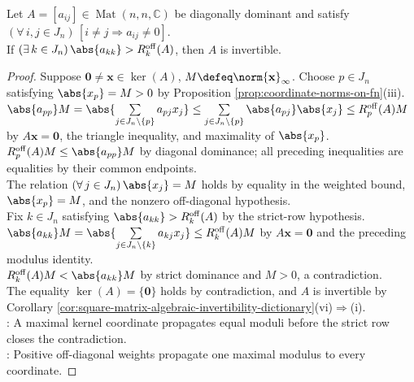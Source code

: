 \begin{theorem} \label{thm:weak-diagonal-dominance-invertible-with-one-strict-row} \\
Let $A=[a_{ij}]\in\operatorname{Mat}(n,n,\mathbb{C})$ be diagonally dominant and satisfy $(\forall\,i,j\in J_n)\,[i\neq j\Longrightarrow a_{ij}\neq0]$.\\
If $(\exists\,k\in J_n)\,\abs{a_{kk}}>R_k^{\mathrm{off}}(A)$, then $A$ is invertible.
\begin{proof}
Suppose $\mathbf{0}\neq\mathbf{x}\in\ker(A)$, $M\defeq\norm{\mathbf{x}}_{\infty}$. Choose $p\in J_n$ satisfying $\abs{x_p}=M>0$ by Proposition \ref{prop:coordinate-norms-on-fn}(iii).\\
$\abs{a_{pp}}M=\abs{\sum\limits_{j\in J_n\setminus\{p\}}a_{pj}x_j}\leq\sum\limits_{j\in J_n\setminus\{p\}}\abs{a_{pj}}\abs{x_j}\leq R_p^{\mathrm{off}}(A)M$ by $A\mathbf{x}=\mathbf{0}$, the triangle inequality, and maximality of $\abs{x_p}$.\\
$R_p^{\mathrm{off}}(A)M\leq\abs{a_{pp}}M$ by diagonal dominance; all preceding inequalities are equalities by their common endpoints.\\
The relation $(\forall\,j\in J_n)\,\abs{x_j}=M$ holds by equality in the weighted bound, $\abs{x_p}=M$, and the nonzero off-diagonal hypothesis.\\
Fix $k\in J_n$ satisfying $\abs{a_{kk}}>R_k^{\mathrm{off}}(A)$ by the strict-row hypothesis.\\
$\abs{a_{kk}}M=\abs{\sum\limits_{j\in J_n\setminus\{k\}}a_{kj}x_j}\leq R_k^{\mathrm{off}}(A)M$ by $A\mathbf{x}=\mathbf{0}$ and the preceding modulus identity.\\
$R_k^{\mathrm{off}}(A)M<\abs{a_{kk}}M$ by strict dominance and $M>0$, a contradiction.\\
The equality $\ker(A)=\{\mathbf{0}\}$ holds by contradiction, and $A$ is invertible by Corollary \ref{cor:square-matrix-algebraic-invertibility-dictionary}(vi)$\Rightarrow$(i).\\
: A maximal kernel coordinate propagates equal moduli before the strict row closes the contradiction.\\
: Positive off-diagonal weights propagate one maximal modulus to every coordinate.
\end{proof}
\end{theorem}

